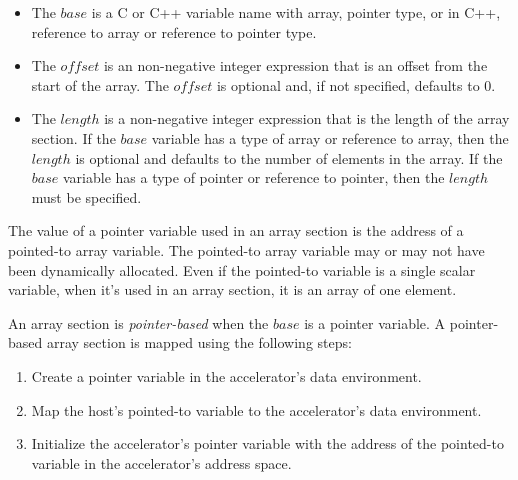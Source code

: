 \begin{itemize}

  \item The $base$ is a C or C++ variable name with array, pointer type, or
  in C++, reference to array or reference to pointer type.

  \item The $offset$ is an non-negative integer expression that is an offset
  from the start of the array.  The $offset$ is optional and, if not specified,
  defaults to 0.

  \item The $length$ is a non-negative integer expression that is the length
  of the array section.   If the $base$ variable has a type of array or
  reference to array, then the $length$ is optional and defaults to the
  number of elements in the array.  If the $base$ variable has a type of
  pointer or reference to pointer, then the $length$ must be specified.

%  
\end{itemize}

The value of a pointer variable used in an array section is the address of a
pointed-to array variable.  The pointed-to array variable may or may not have
been dynamically allocated.  Even if the pointed-to variable is a single scalar
variable, when it's used in an array section, it is an array of one element.

An array section is \emph{pointer-based} when the $base$ is a pointer variable.
A pointer-based array section is mapped using the following steps: \begin{enumerate}

  \item Create a pointer variable in the accelerator's data environment.

  \item Map the host's pointed-to variable to the accelerator's data
  environment.

  \item Initialize the accelerator's pointer variable with the address of the
  pointed-to variable in the accelerator's address space.

\end{enumerate}

